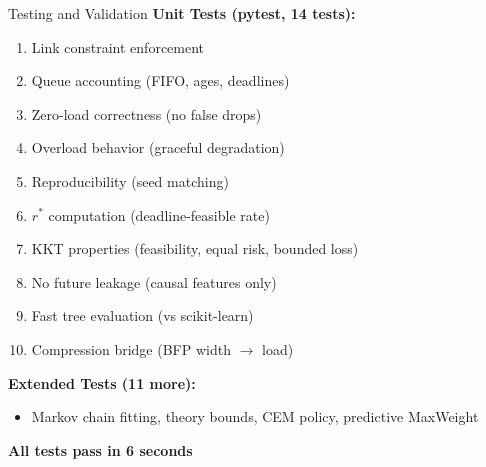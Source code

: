 \documentclass[aspectratio=169]{beamer}
\begin{document}
\begin{frame}{Testing and Validation}
\textbf{Unit Tests (pytest, 14 tests):}
\begin{enumerate}
    \item Link constraint enforcement
    \item Queue accounting (FIFO, ages, deadlines)
    \item Zero-load correctness (no false drops)
    \item Overload behavior (graceful degradation)
    \item Reproducibility (seed matching)
    \item $r^*$ computation (deadline-feasible rate)
    \item KKT properties (feasibility, equal risk, bounded loss)
    \item No future leakage (causal features only)
    \item Fast tree evaluation (vs scikit-learn)
    \item Compression bridge (BFP width $\rightarrow$ load)
\end{enumerate}

\vspace{0.3cm}
\textbf{Extended Tests (11 more):}
\begin{itemize}
    \item Markov chain fitting, theory bounds, CEM policy, predictive MaxWeight
\end{itemize}

\textbf{All tests pass in 6 seconds}
\end{frame}
\end{document}
